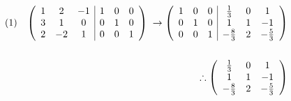 \documentclass[dvipdfmx,uplatex]{jsarticle}
\begin{document}
  \begin{equation}
    \begin{aligned}
        (1)\hspace{3mm}
        \left(
            \begin{array}{ccc|ccc} 
                1 & 2 & -1 & 1 & 0 & 0\\
                3 & 1 & 0 & 0 & 1 & 0\\
                2 & -2 & 1 & 0 & 0 & 1\\
            \end{array} 
        \right) \hspace{1mm} \to
        \left(
            \begin{array}{ccc|ccc} 
                1 & 0 & 0 & \frac{1}{3} & 0 & 1 \\
                0 & 1 & 0 & 1 & 1 & -1 \\
                0 & 0 & 1 & -\frac{8}{3} & 2 & -\frac{5}{3} \\
            \end{array} 
        \right) \nonumber\\
        \\
        \therefore \left(
            \begin{array}{ccc} 
                \frac{1}{3} & 0 & 1 \\
                1 & 1 & -1 \\
                -\frac{8}{3} & 2 & -\frac{5}{3} \\
            \end{array} 
        \right)
    \end{aligned}
  \end{equation}
\end{document}
